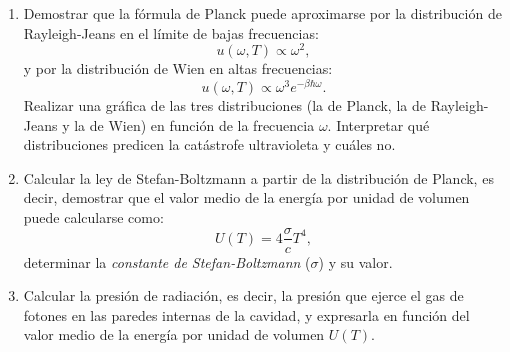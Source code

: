 \documentclass[a4paper,11pt]{article}
\begin{document}
\begin{enumerate}[label=(\alph*),
                  leftmargin=2\parindent,
                  rightmargin=2\parindent]
     \item{Demostrar que la fórmula de Planck puede aproximarse por la
           distribución de Rayleigh-Jeans en el límite de bajas frecuencias:
           $$ u(\omega, T) \propto \omega^2, $$
           y por la distribución de Wien en altas frecuencias:
           $$ u(\omega, T) \propto \omega^3 e^{-\beta \hbar \omega}. $$
           Realizar una gráfica de las tres distribuciones (la de Planck, la
           de Rayleigh-Jeans y la de Wien) en función de la frecuencia
           $\omega$.
           Interpretar qué distribuciones predicen la catástrofe
           ultravioleta y cuáles no.
           }

     \item{Calcular la ley de Stefan-Boltzmann a partir de la distribución
           de Planck, es decir, demostrar que el valor medio de la energía
           por unidad de volumen puede calcularse como:
           $$ U(T) = 4 \frac{\sigma}{c} T^4, $$
           determinar la \emph{constante de Stefan-Boltzmann} ($\sigma$) y su
           valor.
           }

     \item{Calcular la presión de radiación, es decir, la presión que
           ejerce el gas de fotones en las paredes internas de la cavidad, y
           expresarla en función del valor medio de la energía por unidad de
           volumen $U(T)$.
           }

\end{enumerate}
\end{document}
